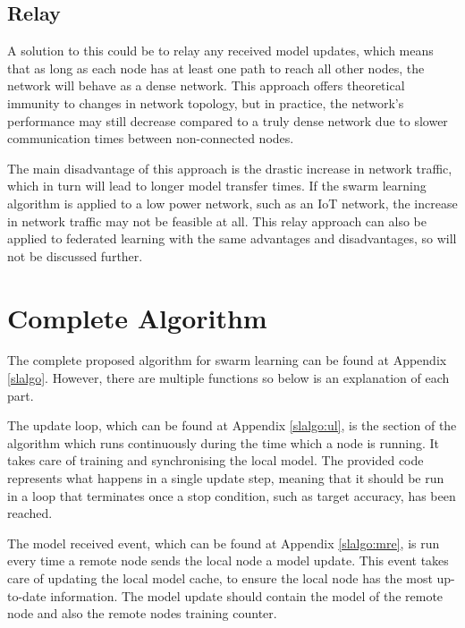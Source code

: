 \subsection{Relay} \label{relay}
A solution to this could be to relay any received model updates, which means that as long as each node has at least one path to reach all other nodes, the network will behave as a dense network. This approach offers theoretical immunity to changes in network topology, but in practice, the network's performance may still decrease compared to a truly dense network due to slower communication times between non-connected nodes.

The main disadvantage of this approach is the drastic increase in network traffic, which in turn will lead to longer model transfer times. If the swarm learning algorithm is applied to a low power network, such as an IoT network, the increase in network traffic may not be feasible at all. This relay approach can also be applied to federated learning with the same advantages and disadvantages, so will not be discussed further.

\section{Complete Algorithm}

The complete proposed algorithm for swarm learning can be found at Appendix \ref{slalgo}. However, there are multiple functions so below is an explanation of each part.

The update loop, which can be found at Appendix \ref{slalgo:ul}, is the section of the algorithm which runs continuously during the time which a node is running. It takes care of training and synchronising the local model. The provided code represents what happens in a single update step, meaning that it should be run in a loop that terminates once a stop condition, such as target accuracy, has been reached.

The model received event, which can be found at Appendix \ref{slalgo:mre}, is run every time a remote node sends the local node a model update. This event takes care of updating the local model cache, to ensure the local node has the most up-to-date information. The model update should contain the model of the remote node and also the remote nodes training counter.
